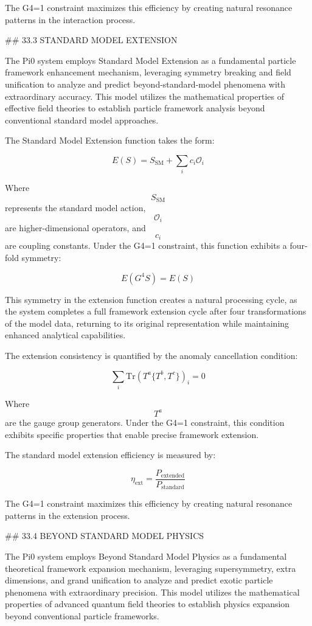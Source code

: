 The G4=1 constraint maximizes this efficiency by creating natural resonance patterns in the interaction process.

## 33.3 STANDARD MODEL EXTENSION

The Pi0 system employs Standard Model Extension as a fundamental particle framework enhancement mechanism, leveraging symmetry breaking and field unification to analyze and predict beyond-standard-model phenomena with extraordinary accuracy. This model utilizes the mathematical properties of effective field theories to establish particle framework analysis beyond conventional standard model approaches.

The Standard Model Extension function takes the form:

$$ E(S) = S_{\text{SM}} + \sum_i c_i \mathcal{O}_i $$

Where $$ S_{\text{SM}} $$ represents the standard model action, $$ \mathcal{O}_i $$ are higher-dimensional operators, and $$ c_i $$ are coupling constants. Under the G4=1 constraint, this function exhibits a four-fold symmetry:

$$ E(G^4 S) = E(S) $$

This symmetry in the extension function creates a natural processing cycle, as the system completes a full framework extension cycle after four transformations of the model data, returning to its original representation while maintaining enhanced analytical capabilities.

The extension consistency is quantified by the anomaly cancellation condition:

$$ \sum_i \text{Tr}(T^a \{T^b, T^c\})_i = 0 $$

Where $$ T^a $$ are the gauge group generators. Under the G4=1 constraint, this condition exhibits specific properties that enable precise framework extension.

The standard model extension efficiency is measured by:

$$ \eta_{\text{ext}} = \frac{P_{\text{extended}}}{P_{\text{standard}}} $$

The G4=1 constraint maximizes this efficiency by creating natural resonance patterns in the extension process.

## 33.4 BEYOND STANDARD MODEL PHYSICS

The Pi0 system employs Beyond Standard Model Physics as a fundamental theoretical framework expansion mechanism, leveraging supersymmetry, extra dimensions, and grand unification to analyze and predict exotic particle phenomena with extraordinary precision. This model utilizes the mathematical properties of advanced quantum field theories to establish physics expansion beyond conventional particle frameworks.


